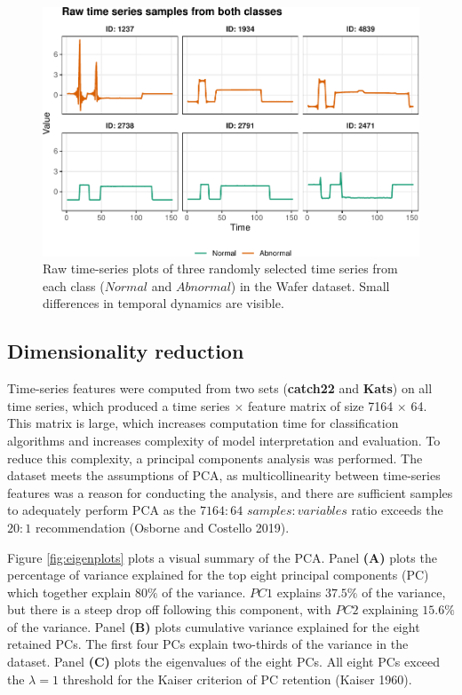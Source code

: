 \documentclass{article}
\begin{document}
\begin{figure}
\centering
\includegraphics{olet5610_report_files/figure-latex/tsplots-1.pdf}
\caption{\label{fig:tsplots}Raw time-series plots of three randomly selected time series from each class (\(Normal\) and \(Abnormal\)) in the Wafer dataset. Small differences in temporal dynamics are visible.}
\end{figure}

\hypertarget{dimensionality-reduction}{%
\subsection{Dimensionality reduction}\label{dimensionality-reduction}}

Time-series features were computed from two sets (\textbf{catch22} and \textbf{Kats}) on all time series, which produced a time series \(\times\) feature matrix of size 7164 \(\times\) 64. This matrix is large, which increases computation time for classification algorithms and increases complexity of model interpretation and evaluation. To reduce this complexity, a principal components analysis was performed. The dataset meets the assumptions of PCA, as multicollinearity between time-series features was a reason for conducting the analysis, and there are sufficient samples to adequately perform PCA as the \(7164:64\) \(samples:variables\) ratio exceeds the \(20:1\) recommendation (Osborne and Costello 2019).

Figure \ref{fig:eigenplots} plots a visual summary of the PCA. Panel \textbf{(A)} plots the percentage of variance explained for the top eight principal components (PC) which together explain 80\(\%\) of the variance. \(PC 1\) explains \(37.5\%\) of the variance, but there is a steep drop off following this component, with \(PC 2\) explaining \(15.6\%\) of the variance. Panel \textbf{(B)} plots cumulative variance explained for the eight retained PCs. The first four PCs explain two-thirds of the variance in the dataset. Panel \textbf{(C)} plots the eigenvalues of the eight PCs. All eight PCs exceed the \(\lambda = 1\) threshold for the Kaiser criterion of PC retention (Kaiser 1960).
\end{document}
